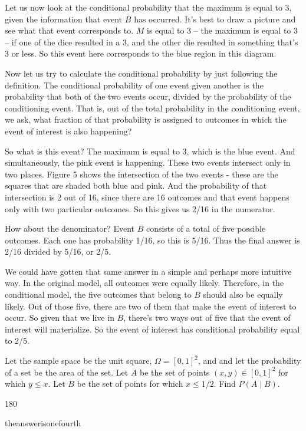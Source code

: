 \documentclass{tufte-handout}
\begin{document}
Let us now look at the conditional probability that the maximum is equal to 3, given the information that
event $B$ has occurred. It's best to draw a picture and see what that event corresponds to. $M$ is equal to
3 -- the maximum is equal to 3 -- if one of the dice resulted in a 3, and the other die resulted in
something that's 3 or less. So this event here corresponds to the blue region in this diagram.

Now let us try to calculate the conditional probability by just following the definition. The conditional
probability of one event given another is the probability that both of the two events 
occur, divided by the probability of the conditioning event. That is, out of the total probability in the
conditioning event, we ask, what fraction of that probability is assigned to outcomes in which the event
of interest is also happening?

So what is this event? The maximum is equal to 3, which is the blue event. And simultaneously, the pink
event is happening. These two events intersect only in two places. Figure 5 shows the intersection of the two
events - these are the squares that are shaded both blue and pink. And the probability of that intersection is 
2 out of 16, since there are 16 outcomes and that event
happens only with two particular outcomes. So this gives us 2/16 in the numerator.

How about the denominator? Event $B$ consists of a total of five possible outcomes. Each one has
probability 1/16, so this is 5/16. Thus the final answer is 2/16 divided by 5/16, or 2/5.

We could have gotten that same answer in a simple and perhaps more intuitive way. In the original
model, all outcomes were equally likely. Therefore, in the conditional model, the five outcomes that
belong to $B$ should also be equally likely. Out of those five, there are two of them that make the event of
interest to occur. So given that we live in $B$, there's two ways out of five that the event of interest will
materialize. So the event of interest has conditional probability equal to 2/5.


 Let the sample space be the unit square, $\Omega  = [0, 1]^2$, and
and let the probability of a set be the area of the set. Let $A$ be the set of points $(x, y) \in [0, 1]^2$ for which $y \leq x$.
Let $B$ be the set of points for which $x \leq 1/2$. Find $P(A \mid B)$.

\begin{turn}{180} 
\color{teal}
\begin{minipage}{\linewidth}
\scriptsize
theanswerisonefourth%
\end{minipage}
\end{turn}
\end{document}
